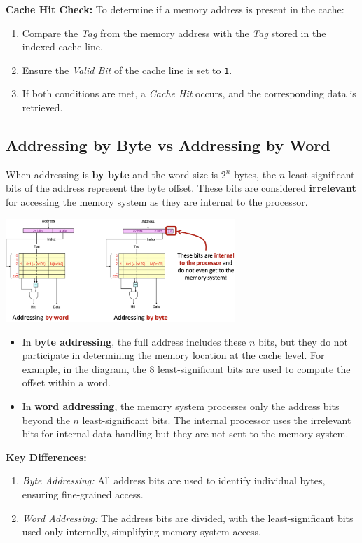 \textbf{Cache Hit Check:} To determine if a memory address is present in the cache:
\begin{enumerate}
    \item Compare the \textit{Tag} from the memory address with the \textit{Tag} stored in the indexed cache line.
    \item Ensure the \textit{Valid Bit} of the cache line is set to \texttt{1}.
    \item If both conditions are met, a \textit{Cache Hit} occurs, and the corresponding data is retrieved.
\end{enumerate}

\subsection{Addressing by Byte vs Addressing by Word}
When addressing is \textbf{by byte} and the word size is $2^n$ bytes, the $n$ least-significant bits of the address represent the byte offset. These bits are considered \textbf{irrelevant} for accessing the memory system as they are internal to the processor.
\begin{center}
    \includegraphics[width=0.65\textwidth]{chapters/chapter3a/images/byte.png}
\end{center}
\begin{itemize}
    \item In \textbf{byte addressing}, the full address includes these $n$ bits, but they do not participate in determining the memory location at the cache level. For example, in the diagram, the 8 least-significant bits are used to compute the offset within a word.
    \item In \textbf{word addressing}, the memory system processes only the address bits beyond the $n$ least-significant bits. The internal processor uses the irrelevant bits for internal data handling but they are not sent to the memory system.
\end{itemize}

\textbf{Key Differences:}
\begin{enumerate}
    \item \textit{Byte Addressing:} All address bits are used to identify individual bytes, ensuring fine-grained access.
    \item \textit{Word Addressing:} The address bits are divided, with the least-significant bits used only internally, simplifying memory system access.
\end{enumerate}

